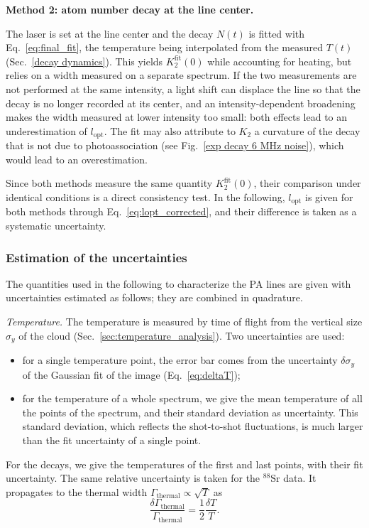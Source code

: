 \textbf{Method 2: atom number decay at the line center.}

The laser is set at the line center and the decay $N(t)$ is fitted with
Eq.~\ref{eq:final_fit}, the temperature being interpolated from the measured
$T(t)$ (Sec.~\ref{decay dynamics}). This yields $K_2^{\text{fit}}(0)$ while
accounting for heating, but relies on a width measured on a separate spectrum.
If the two measurements are not performed at the same intensity, a light shift can
displace the line so that the decay is no longer recorded at its center, and an
intensity-dependent broadening makes the width measured at lower intensity too
small: both effects lead to an underestimation of $l_{\text{opt}}$. The fit may
also attribute to $K_2$ a curvature of the decay that is not due to
photoassociation (see Fig.~\ref{exp decay 6 MHz noise}), which would lead to an
overestimation.

Since both methods measure the same quantity $K_2^{\text{fit}}(0)$, their
comparison under identical conditions is a direct consistency test. In the
following, $l_{\text{opt}}$ is given for both methods through
Eq.~\ref{eq:lopt_corrected}, and their difference is taken as a systematic
uncertainty.

\subsubsection{Estimation of the uncertainties}
\label{sec:uncertainties}
The quantities used in the following to characterize the PA lines are given with
uncertainties estimated as follows; they are combined in quadrature.

\textit{Temperature.} The temperature is measured by time of flight from the vertical
size $\sigma_y$ of the cloud (Sec.~\ref{sec:temperature_analysis}). Two uncertainties are used:
\begin{itemize}
    \item for a single temperature point, the error bar comes from the uncertainty
    $\delta\sigma_y$ of the Gaussian fit of the image (Eq.~\ref{eq:deltaT});
    \item for the temperature of a whole spectrum, we give the mean temperature of all the
    points of the spectrum, and their standard deviation as uncertainty. This standard
    deviation, which reflects the shot-to-shot fluctuations, is much larger than the fit
    uncertainty of a single point.
\end{itemize}
For the decays, we give the temperatures of the first and last points, with their fit
uncertainty. The same relative uncertainty is taken for the $^{88}\text{Sr}$ data. It propagates to the thermal width $\Gamma_{\text{thermal}}\propto\sqrt{T}$ as
\begin{equation}
\frac{\delta\Gamma_{\text{thermal}}}{\Gamma_{\text{thermal}}}=\frac{1}{2}\frac{\delta T}{T}.
\end{equation}


